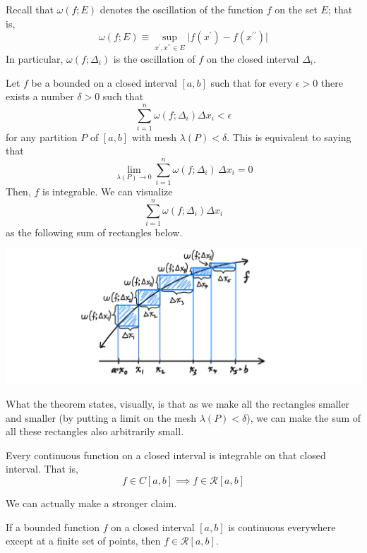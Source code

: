   Recall that $\omega(f; E)$ denotes the oscillation of the function $f$ on the set $E$; that is, 
  \[\omega(f; E) \equiv \sup_{x^\prime, x^{\prime\prime} \in E} \big| f(x^\prime) - f(x^{\prime\prime})\big|\]
  In particular, $\omega(f; \Delta_i)$ is the oscillation of $f$ on the closed interval $\Delta_i$. 

  \begin{theorem}
  Let $f$ be a bounded on a closed interval $[a, b]$ such that for every $\epsilon > 0$ there exists a number $\delta>0$ such that
  \[\sum_{i=1}^n \omega(f; \Delta_i) \Delta x_i < \epsilon\]
  for any partition $P$ of $[a, b]$ with mesh $\lambda(P) < \delta$. This is equivalent to saying that
  \[\lim_{\lambda(P) \rightarrow 0} \sum_{i = 1}^n \omega (f; \Delta_i) \, \Delta x_i = 0\]
  Then, $f$ is integrable. We can visualize
  \[\sum_{i=1}^n \omega(f; \Delta_i) \Delta x_i\]
  as the following sum of rectangles below. 
  \begin{center}
      \includegraphics[scale=0.25]{img/Sufficient_Condition_for_Integrability.PNG}
  \end{center}
  What the theorem states, visually, is that as we make all the rectangles smaller and smaller (by putting a limit on the mesh $\lambda(P)<\delta$), we can make the sum of all these rectangles also arbitrarily small. 
  \end{theorem}

  \begin{corollary}
  Every continuous function on a closed interval is integrable on that closed interval. That is, 
  \[f \in C[a, b] \implies f \in \mathcal{R}[a, b]\]
  \end{corollary}

  We can actually make a stronger claim. 

  \begin{corollary}
  If a bounded function $f$ on a closed interval $[a, b]$ is continuous everywhere except at a finite set of points, then $f \in \mathcal{R}[a, b]$. 
  \end{corollary}

